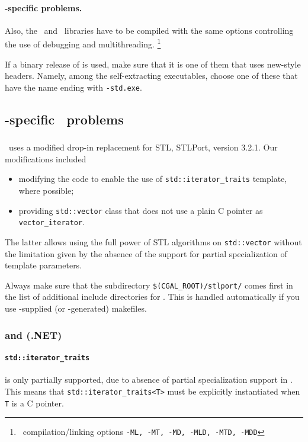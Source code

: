 \paragraph{\msvc-specific problems.}

Also, the \leda\ and \cgal\ libraries have to be compiled with the
same options controlling the use of debugging and multithreading.
\footnote{\msvc\ compilation/linking options \texttt{-ML, -MT, -MD,
    -MLD, -MTD, -MDD}}

If a binary release of \leda{} is used, make sure that it is one of
them that uses new-style headers. Namely, among the self-extracting
executables, choose one of these that have the name ending with
\texttt{-std.exe}.

\subsection{\msvc{}-specific \CC\ problems}

\subsubsection{}

\cgal\ uses a modified drop-in replacement for STL, STLPort, version
3.2.1. Our modifications included
\begin{itemize}
\item modifying the code to enable
the use of \texttt{std::iterator\_traits} template, where possible;
\item providing \texttt{std::vector} class that does not use
a plain C pointer as \texttt{vector\_iterator}.
\end{itemize}
The latter allows using the full power of STL algorithms on
\texttt{std::vector} without the limitation given by the absence
of the support for partial specialization of template parameters.

Always make sure that the subdirectory
\texttt{\$(CGAL\_ROOT)/stlport/} %
comes first in the list of additional include directories for \msvc.
This is handled automatically if you use \cgal-supplied (or \cgal-generated)
makefiles.

\subsubsection{ and 
  (\textsc{.NET})}

\paragraph{\texttt{std::iterator\_traits}} is only partially
supported, due to absence of partial specialization support in \msvc.
This means that \texttt{std::iterator\_traits<T>} must be explicitly
instantiated when \texttt{T} is a C pointer. 

